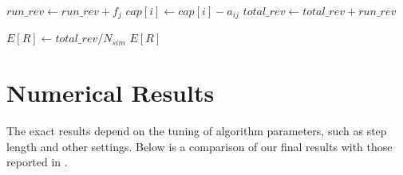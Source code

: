 \documentclass[11pt]{article}
\begin{document}
\begin{algorithm}[H]
\begin{algorithmic}[1]
             
                \State $run\_rev \gets run\_rev + f_{j}$
                 
                    \State $cap[i] \gets cap[i] - a_{ij}$
                \EndFor
            \EndIf
        \EndIf
    \EndFor {}
    \State $total\_rev \gets total\_rev + run\_rev$
\EndFor {}

\State $E[R] \gets total\_rev / N_{sim}$
\State \Return $E[R]$
\end{algorithmic}
\end{algorithm}


% 

\newpage

\section{Numerical Results}

The exact results depend on the tuning of algorithm parameters, such as step length and other settings. 
Below is a comparison of our final results with those reported in \cite{topaloglu2009using}.
\end{document}
